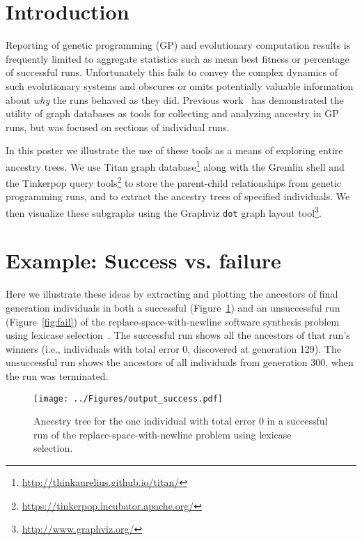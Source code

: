 \documentclass{sig-alternate}
\begin{document}
\section{Introduction}
\label{sec:introduction}

Reporting of genetic programming (GP) and evolutionary computation results is frequently limited to aggregate statistics such as mean best fitness or percentage of successful runs. Unfortunately this fails to convey the complex dynamics of such evolutionary systems and obscures or omits potentially valuable information about \emph{why} the runs behaved as they did. Previous work~\cite{McPhee:2015:GPTP} has demonstrated the utility of graph databases as tools for collecting and analyzing ancestry in GP runs, but was focused on sections of individual runs.

In this poster we illustrate the use of these tools as a means of exploring entire ancestry trees. We use Titan graph database\footnote{\url{http://thinkaurelius.github.io/titan/}} along with the Gremlin shell and the Tinkerpop query tools\footnote{\url{https://tinkerpop.incubator.apache.org/}} to store the parent-child relationships from genetic programming runs, and to extract the ancestry trees of specified individuals. We then visualize these subgraphs using the Graphviz \texttt{dot} graph layout tool\footnote{\url{http://www.graphviz.org/}}.

\section{Example: Success vs. failure}
\label{sec:examples}

Here we illustrate these ideas by extracting and plotting the ancestors of final generation individuals in both a successful (Figure~\ref{fig:success}) and an unsuccessful run (Figure~\ref{fig:fail}) of the replace-space-with-newline software synthesis problem~\cite{Helmuth:2015:GECCO,Helmuth:2015:dissertation} using lexicase selection~\cite{Helmuth:2014:ieeeTEC}. The successful run shows all the ancestors of that run's winners (i.e., individuals with total error 0, discovered at generation 129). The unsuccessful run shows the ancestors of all individuals from generation 300, when the run was terminated.

\begin{figure}[t]
	\centering
	\texttt{[image: ../Figures/output\_success.pdf]}
	\caption{Ancestry tree for the one individual with total error 0 in a successful run of the replace-space-with-newline problem using lexicase selection.}
	\label{fig:success}
\end{figure}
\end{document}
